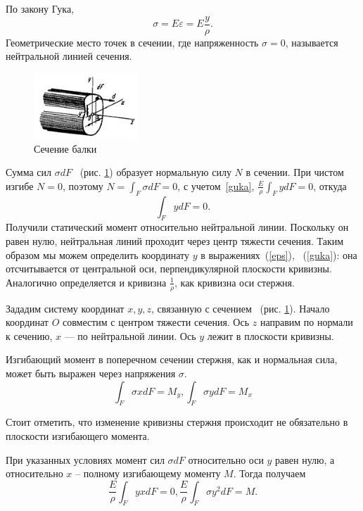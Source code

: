 \documentclass[12pt, a4paper]{article}
\begin{document}
По закону Гука, 
\begin{equation}
	\label{guka}
	\sigma = E \varepsilon = E \frac{y}{\rho}.
\end{equation}
Геометрические место точек в сечении, где напряженность $\sigma = 0$, называется нейтральной линией сечения.
\begin{figure}[!h]
	\centering
	\includegraphics[width=0.35\textwidth]{pic.5}%
	\caption{Сечение балки}
	\vspace*{-2mm}
	\label{pic5}
\end{figure}

Сумма сил $\sigma d F$ ~(рис. \ref{pic5}) образует нормальную силу $N$ в сечении. При чистом изгибе $N = 0$, поэтому $N = \int_{F} \sigma d F = 0$, с учетом~\ref{guka}, $\frac{E}{\rho} \int_{F} y d F = 0$, откуда 
\begin{equation}
	\label{ydF}
	\int_{F} y d F = 0.
\end{equation}
Получили статический момент относительно нейтральной линии. Поскольку он равен нулю, нейтральная линий проходит через центр тяжести сечения. Таким образом мы можем определить координату $y$ в выражениях~(\ref{eps}), ~(\ref{guka}): она отсчитывается от центральной оси, перпендикулярной плоскости кривизны. Аналогично определяется и кривизна $\frac{1}{\rho}$, как кривизна оси стержня. 

Зададим систему координат $x, y, z$, связанную с сечением ~(рис. \ref{pic5}). Начало координат $O$ совместим с центром тяжести сечения. Ось $z$ направим по нормали к сечению, $x$ --- по нейтральной линии. Ось $y$ лежит в плоскости кривизны.

Изгибающий момент в поперечном сечении стержня, как и нормальная сила, может быть выражен через напряжения $\sigma$. 
\begin{equation}
	\label{bendM}
	\int_{F} \sigma x d F = M_y, \int_{F} \sigma y d F = M_x
\end{equation}

Стоит отметить, что изменение кривизны стержня происходит не обязательно в плоскости изгибающего момента.

При указанных условиях момент сил $\sigma d F$ относительно оси $y$ равен нулю, а относительно $x$ -- полному изгибающему моменту $M$. Тогда получаем
\begin{equation}
	\label{bendM2}
	\frac{E}{\rho} \int_{F} y x d F = 0, \frac{E}{\rho} \int_{F} \sigma y^2 d F = M.
\end{equation}
\end{document}
